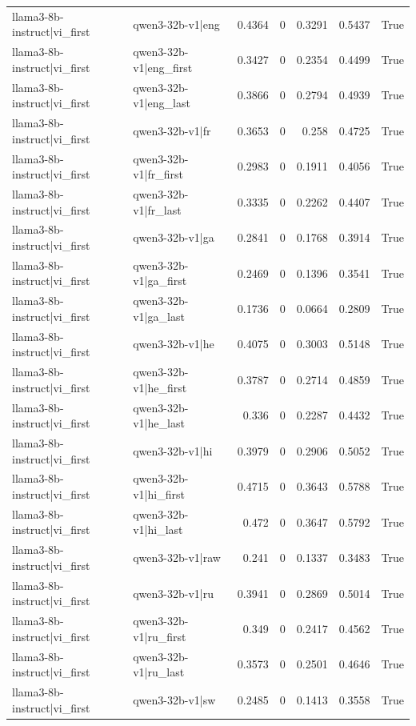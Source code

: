 \begin{table}
\begin{tabular}{l l r r r r l}
llama3-8b-instruct|vi_first & qwen3-32b-v1|eng & 0.4364 & 0 & 0.3291 & 0.5437 & True \\
llama3-8b-instruct|vi_first & qwen3-32b-v1|eng_first & 0.3427 & 0 & 0.2354 & 0.4499 & True \\
llama3-8b-instruct|vi_first & qwen3-32b-v1|eng_last & 0.3866 & 0 & 0.2794 & 0.4939 & True \\
llama3-8b-instruct|vi_first & qwen3-32b-v1|fr & 0.3653 & 0 & 0.258 & 0.4725 & True \\
llama3-8b-instruct|vi_first & qwen3-32b-v1|fr_first & 0.2983 & 0 & 0.1911 & 0.4056 & True \\
llama3-8b-instruct|vi_first & qwen3-32b-v1|fr_last & 0.3335 & 0 & 0.2262 & 0.4407 & True \\
llama3-8b-instruct|vi_first & qwen3-32b-v1|ga & 0.2841 & 0 & 0.1768 & 0.3914 & True \\
llama3-8b-instruct|vi_first & qwen3-32b-v1|ga_first & 0.2469 & 0 & 0.1396 & 0.3541 & True \\
llama3-8b-instruct|vi_first & qwen3-32b-v1|ga_last & 0.1736 & 0 & 0.0664 & 0.2809 & True \\
llama3-8b-instruct|vi_first & qwen3-32b-v1|he & 0.4075 & 0 & 0.3003 & 0.5148 & True \\
llama3-8b-instruct|vi_first & qwen3-32b-v1|he_first & 0.3787 & 0 & 0.2714 & 0.4859 & True \\
llama3-8b-instruct|vi_first & qwen3-32b-v1|he_last & 0.336 & 0 & 0.2287 & 0.4432 & True \\
llama3-8b-instruct|vi_first & qwen3-32b-v1|hi & 0.3979 & 0 & 0.2906 & 0.5052 & True \\
llama3-8b-instruct|vi_first & qwen3-32b-v1|hi_first & 0.4715 & 0 & 0.3643 & 0.5788 & True \\
llama3-8b-instruct|vi_first & qwen3-32b-v1|hi_last & 0.472 & 0 & 0.3647 & 0.5792 & True \\
llama3-8b-instruct|vi_first & qwen3-32b-v1|raw & 0.241 & 0 & 0.1337 & 0.3483 & True \\
llama3-8b-instruct|vi_first & qwen3-32b-v1|ru & 0.3941 & 0 & 0.2869 & 0.5014 & True \\
llama3-8b-instruct|vi_first & qwen3-32b-v1|ru_first & 0.349 & 0 & 0.2417 & 0.4562 & True \\
llama3-8b-instruct|vi_first & qwen3-32b-v1|ru_last & 0.3573 & 0 & 0.2501 & 0.4646 & True \\
llama3-8b-instruct|vi_first & qwen3-32b-v1|sw & 0.2485 & 0 & 0.1413 & 0.3558 & True \\

\end{tabular}
\end{table}
